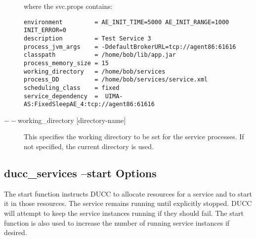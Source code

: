 \begin{description}
        where the svc.props contains: 

\begin{verbatim}
environment         = AE_INIT_TIME=5000 AE_INIT_RANGE=1000 INIT_ERROR=0
description         = Test Service 3
process_jvm_args    = -DdefaultBrokerURL=tcp://agent86:61616
classpath           = /home/bob/lib/app.jar
process_memory_size = 15
working_directory   = /home/bob/services
process_DD          = /home/bob/services/service.xml
scheduling_class    = fixed
service_dependency  =  UIMA-AS:FixedSleepAE_4:tcp://agent86:61616
\end{verbatim}
        
        \item[$--$working\_directory {[directory-name]}]
          This specifies the working directory to be set for the service processes. 
          If not specified, the current directory is used.
    \end{description}


    \subsection{ducc\_services --start Options}

    The start function instructs DUCC to allocate resources for a service and to start it in those
    resources. The service remains running until explicitly stopped. DUCC will attempt to keep the
    service instances running if they should fail. The start function is also used to increase the
    number of running service instances if desired.
    
